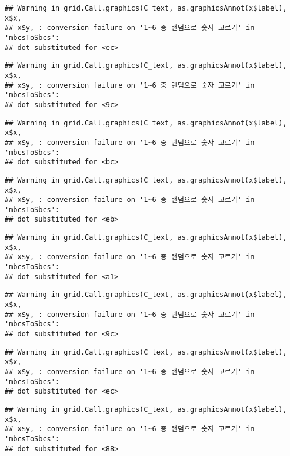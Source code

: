 \documentclass[]{book}
\begin{document}
\begin{verbatim}
## Warning in grid.Call.graphics(C_text, as.graphicsAnnot(x$label), x$x,
## x$y, : conversion failure on '1~6 중 랜덤으로 숫자 고르기' in 'mbcsToSbcs':
## dot substituted for <ec>
\end{verbatim}

\begin{verbatim}
## Warning in grid.Call.graphics(C_text, as.graphicsAnnot(x$label), x$x,
## x$y, : conversion failure on '1~6 중 랜덤으로 숫자 고르기' in 'mbcsToSbcs':
## dot substituted for <9c>
\end{verbatim}

\begin{verbatim}
## Warning in grid.Call.graphics(C_text, as.graphicsAnnot(x$label), x$x,
## x$y, : conversion failure on '1~6 중 랜덤으로 숫자 고르기' in 'mbcsToSbcs':
## dot substituted for <bc>
\end{verbatim}

\begin{verbatim}
## Warning in grid.Call.graphics(C_text, as.graphicsAnnot(x$label), x$x,
## x$y, : conversion failure on '1~6 중 랜덤으로 숫자 고르기' in 'mbcsToSbcs':
## dot substituted for <eb>
\end{verbatim}

\begin{verbatim}
## Warning in grid.Call.graphics(C_text, as.graphicsAnnot(x$label), x$x,
## x$y, : conversion failure on '1~6 중 랜덤으로 숫자 고르기' in 'mbcsToSbcs':
## dot substituted for <a1>
\end{verbatim}

\begin{verbatim}
## Warning in grid.Call.graphics(C_text, as.graphicsAnnot(x$label), x$x,
## x$y, : conversion failure on '1~6 중 랜덤으로 숫자 고르기' in 'mbcsToSbcs':
## dot substituted for <9c>
\end{verbatim}

\begin{verbatim}
## Warning in grid.Call.graphics(C_text, as.graphicsAnnot(x$label), x$x,
## x$y, : conversion failure on '1~6 중 랜덤으로 숫자 고르기' in 'mbcsToSbcs':
## dot substituted for <ec>
\end{verbatim}

\begin{verbatim}
## Warning in grid.Call.graphics(C_text, as.graphicsAnnot(x$label), x$x,
## x$y, : conversion failure on '1~6 중 랜덤으로 숫자 고르기' in 'mbcsToSbcs':
## dot substituted for <88>
\end{verbatim}
\end{document}
